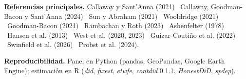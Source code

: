 \documentclass[final,t]{beamer}
\begin{document}
\begin{frame}[t]{}
\colorbox{tinta}{%
\begin{minipage}[t]{\dimexpr\paperwidth-2.4cm\relax}
\vspace{0.7cm}
\hspace{0.8cm}%
\begin{minipage}[t]{0.63\linewidth}
  {\color{papel!65}\small\textbf{\color{papel}Referencias principales.}
  Callaway y Sant'Anna (2021) \textbullet\ Callaway, Goodman-Bacon y Sant'Anna (2024)
  \textbullet\ Sun y Abraham (2021) \textbullet\ Wooldridge (2021) \textbullet\ Goodman-Bacon (2021)
  \textbullet\ Rambachan y Roth (2023) \textbullet\ Ashenfelter (1978) \textbullet\ Hansen et al. (2013)
  \textbullet\ West et al. (2020, 2023) \textbullet\ Guizar-Coutiño et al. (2022)
  \textbullet\ Swinfield et al. (2026) \textbullet\ Probst et al. (2024).}
\end{minipage}\hfill
\begin{minipage}[t]{0.32\linewidth}
  {\color{papel!65}\small\textbf{\color{papel}Reproducibilidad.}
  Panel en Python (pandas, GeoPandas, Google Earth Engine); estimación en R
  (\textit{did}, \textit{fixest}, \textit{etwfe}, \textit{contdid} 0.1.1, \textit{HonestDiD}, \textit{spdep}).}
\end{minipage}
\hspace{0.8cm}
\vspace{0.7cm}
\end{minipage}}

\end{frame}
\end{document}
